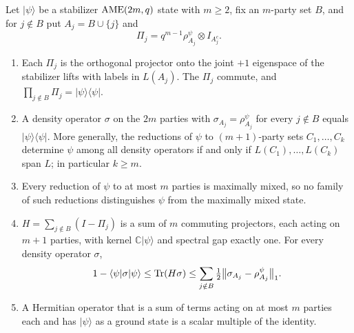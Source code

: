 \begin{proposition}
\label{prop:marginal-certification}
Let \(\lvert\psi\rangle\) be a stabilizer \(\mathrm{AME}(2m,q)\) state with
\(m\geq2\), fix an \(m\)-party set \(B\), and for \(j\notin B\) put
\(A_j=B\cup\{j\}\) and
\[
 \Pi_j=q^{m-1}\rho^\psi_{A_j}\otimes I_{A_j^c}.
\]
\begin{enumerate}
\item Each \(\Pi_j\) is the orthogonal projector onto the joint \(+1\)
 eigenspace of the stabilizer lifts with labels in \(L(A_j)\).  The
 \(\Pi_j\) commute, and
 \(\prod_{j\notin B}\Pi_j=\lvert\psi\rangle\langle\psi\rvert\).
\item A density operator \(\sigma\) on the \(2m\) parties with
 \(\sigma_{A_j}=\rho^\psi_{A_j}\) for every \(j\notin B\) equals
 \(\lvert\psi\rangle\langle\psi\rvert\).  More generally, the reductions
 of \(\psi\) to \((m+1)\)-party sets \(C_1,\ldots,C_k\) determine \(\psi\)
 among all density operators if and only if \(L(C_1),\ldots,L(C_k)\) span
 \(L\); in particular \(k\geq m\).
\item Every reduction of \(\psi\) to at most \(m\) parties is maximally
 mixed, so no family of such reductions distinguishes \(\psi\) from the
 maximally mixed state.
\item \(H=\sum_{j\notin B}(I-\Pi_j)\) is a sum of \(m\) commuting
 projectors, each acting on \(m+1\) parties, with kernel
 \(\mathbb C\lvert\psi\rangle\) and spectral gap exactly one.  For every
 density operator \(\sigma\),
 \[
  1-\langle\psi\rvert\sigma\lvert\psi\rangle
  \leq\operatorname{Tr}(H\sigma)
  \leq\sum_{j\notin B}\tfrac12\bigl\|\sigma_{A_j}-\rho^\psi_{A_j}\bigr\|_1 .
 \]
\item A Hermitian operator that is a sum of terms acting on at most \(m\)
 parties each and has \(\lvert\psi\rangle\) as a ground state is a scalar
 multiple of the identity.
\end{enumerate}
\end{proposition}

